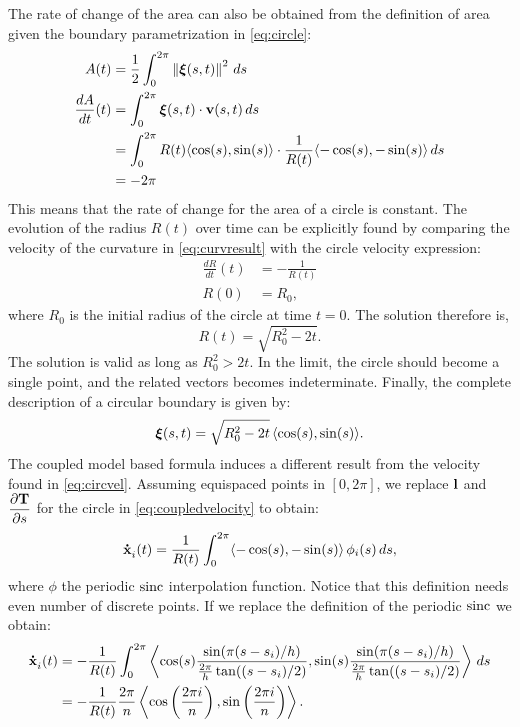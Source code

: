 The rate of change of the area can also be obtained from the definition of area given the boundary parametrization in \eqref{eq:circle}:
\begin{align}
    A(t) &= \frac{1}{2} \int_0^{2\pi} \left\lVert\bm{\xi}(s,t)\right\rVert^2\, ds\nonumber\\
    \dfrac{dA}{dt}(t) &= \int_0^{2\pi} \bm{\xi}(s,t)\cdot \mathbf{v}(s,t)\,ds \nonumber\\
    &= \int_0^{2\pi} R(t)\langle \cos(s),\sin(s)\rangle \cdot \frac{1}{R(t)} \langle -\cos(s),-\sin(s)\rangle \,ds \nonumber\\
    &= -2\pi \label{eq:dAdtcircle}
\end{align}
This means that the rate of change for the area of a circle is constant. The evolution of the radius $R(t)$ over time can be explicitly found by comparing the velocity of the curvature in \eqref{eq:curvresult} with the circle velocity expression:
\begin{align}
    \frac{dR}{dt}(t) &= -\frac{1}{R(t)} \label{eq:circvel}\\
    R(0) &= R_0, \nonumber
\end{align}
where $R_0$ is the initial radius of the circle at time $t=0$. The solution therefore is,
\begin{equation}
    R(t) = \sqrt{R_0^2 - 2t}.
    \label{eq:radii}
\end{equation}
The solution is valid as long as $R_0^2 > 2t$. In the limit, the circle should become a single point, and the related vectors becomes indeterminate. Finally, the complete description of a circular boundary is given by:
\begin{equation}
    \bm{\xi}(s,t) = \sqrt{R_0^2 - 2t}\,\langle \cos(s), \sin(s) \rangle.
\end{equation}
The coupled model based formula induces a different result from the velocity found in \eqref{eq:circvel}. Assuming equispaced points in $[0, 2\pi]$, we replace $\mathbf{l}$ and $\dfrac{\partial \mathbf{T}}{\partial s}$ for the circle in \eqref{eq:coupledvelocity} to obtain:
\begin{equation}
    \dotx[i](t) = \frac{1}{R(t)} \int_0^{2\pi}  \langle -\cos(s), -\sin(s)\rangle \,\phi_i(s)\, ds,
\end{equation}
where $\phi$ the periodic $\operatorname{sinc}$ interpolation function. Notice that this definition needs even number of discrete points. If we replace the definition of the periodic $\operatorname{sinc}$ we obtain:
\begin{align}
    \dotx[i](t) &= -\frac{1}{R(t)} \int_0^{2\pi} \left\langle \cos(s)\frac{\sin(\pi(s-s_i) / h)}{\frac{2\pi}{h} \tan((s-s_i)/2)}, \sin(s)\frac{\sin(\pi(s-s_i) / h)}{\frac{2\pi}{h} \tan((s-s_i)/2)} \right\rangle\,ds\\
    &= -\frac{1}{R(t)}  \frac{2\pi}{n}\left\langle\cos \left(\frac{2\pi i}{n}\right), \sin\left(\frac{2\pi i }{n}\right)\right\rangle.
    \label{eq:curvaturevelocity}
\end{align}
